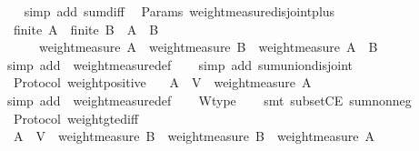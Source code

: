 \begin{isabellebody}
\ \ \isamarkupfalse%
\ {\isacharparenleft}simp\ add{\isacharcolon}\ sum{\isacharunderscore}diff{\isacharparenright}%
\endisatagproof
{\isafoldproof}%
%
\isadelimproof
\isanewline
%
\endisadelimproof
\isanewline
{}\isamarkupfalse%
\ {\isacharparenleft}\ Params{\isacharparenright}\ weight{\isacharunderscore}measure{\isacharunderscore}disjoint{\isacharunderscore}plus\ {\isacharcolon}\isanewline
\ \ {\isachardoublequoteopen}finite\ A\ {\isasymLongrightarrow}\ finite\ B\ {\isasymLongrightarrow}\ A\ {\isasyminter}\ B\ {\isacharequal}\ {\isasymemptyset}\isanewline
\ \ \ \ {\isasymLongrightarrow}\ \ weight{\isacharunderscore}measure\ A\ {\isacharplus}\ weight{\isacharunderscore}measure\ B\ {\isacharequal}\ weight{\isacharunderscore}measure\ {\isacharparenleft}A\ {\isasymunion}\ B{\isacharparenright}{\isachardoublequoteclose}\isanewline
%
\isadelimproof
\ \ %
\endisadelimproof
%
\isatagproof
{}\isamarkupfalse%
\ {\isacharparenleft}simp\ add{\isacharcolon}\ \ weight{\isacharunderscore}measure{\isacharunderscore}def{\isacharparenright}\isanewline
\ \ \isamarkupfalse%
\ {\isacharparenleft}simp\ add{\isacharcolon}\ sum{\isachardot}union{\isacharunderscore}disjoint{\isacharparenright}%
\endisatagproof
{\isafoldproof}%
%
\isadelimproof
\isanewline
%
\endisadelimproof
\isanewline
{}\isamarkupfalse%
\ {\isacharparenleft}\ Protocol{\isacharparenright}\ weight{\isacharunderscore}positive\ {\isacharcolon}\isanewline
\ \ {\isachardoublequoteopen}A\ {\isasymsubseteq}\ V\ {\isasymLongrightarrow}\ weight{\isacharunderscore}measure\ A\ {\isasymge}\ {}{\isachardoublequoteclose}\isanewline
%
\isadelimproof
\ \ %
\endisadelimproof
%
\isatagproof
{}\isamarkupfalse%
\ {\isacharparenleft}simp\ add{\isacharcolon}\ \ weight{\isacharunderscore}measure{\isacharunderscore}def{\isacharparenright}\isanewline
\ \ \isamarkupfalse%
\ W{\isacharunderscore}type\isanewline
\ \ \isamarkupfalse%
\ {\isacharparenleft}smt\ subsetCE\ sum{\isacharunderscore}nonneg{\isacharparenright}%
\endisatagproof
{\isafoldproof}%
%
\isadelimproof
\isanewline
%
\endisadelimproof
\isanewline
{}\isamarkupfalse%
\ {\isacharparenleft}\ Protocol{\isacharparenright}\ weight{\isacharunderscore}gte{\isacharunderscore}diff\ {\isacharcolon}\isanewline
\ \ {\isachardoublequoteopen}A\ {\isasymsubseteq}\ V\ {\isasymLongrightarrow}\ weight{\isacharunderscore}measure\ B\ {\isasymge}\ weight{\isacharunderscore}measure\ B\ {\isacharminus}\ weight{\isacharunderscore}measure\ A{\isachardoublequoteclose}\isanewline

\end{isabellebody}
